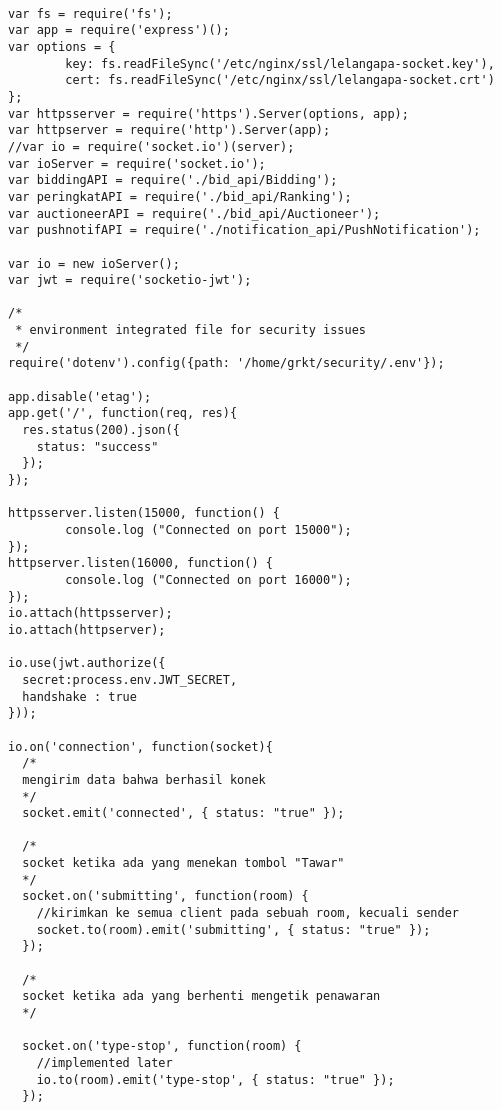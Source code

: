 \begin{lstlisting}[label=sc-socket-bid,style=htmlcssjs,caption=Kode Sumber Implementasi Node.js + Socket.io untuk Lelang]

var fs = require('fs');
var app = require('express')();
var options = {
        key: fs.readFileSync('/etc/nginx/ssl/lelangapa-socket.key'),
        cert: fs.readFileSync('/etc/nginx/ssl/lelangapa-socket.crt')
};
var httpsserver = require('https').Server(options, app);
var httpserver = require('http').Server(app);
//var io = require('socket.io')(server);
var ioServer = require('socket.io');
var biddingAPI = require('./bid_api/Bidding');
var peringkatAPI = require('./bid_api/Ranking');
var auctioneerAPI = require('./bid_api/Auctioneer');
var pushnotifAPI = require('./notification_api/PushNotification');

var io = new ioServer();
var jwt = require('socketio-jwt');

/*  
 * environment integrated file for security issues
 */
require('dotenv').config({path: '/home/grkt/security/.env'});

app.disable('etag');
app.get('/', function(req, res){
  res.status(200).json({
    status: "success"
  });
});

httpsserver.listen(15000, function() {
        console.log ("Connected on port 15000");
});
httpserver.listen(16000, function() {
        console.log ("Connected on port 16000");
});
io.attach(httpsserver);
io.attach(httpserver);

io.use(jwt.authorize({
  secret:process.env.JWT_SECRET,
  handshake : true
}));

io.on('connection', function(socket){
  /*
  mengirim data bahwa berhasil konek
  */
  socket.emit('connected', { status: "true" });

  /*
  socket ketika ada yang menekan tombol "Tawar"
  */
  socket.on('submitting', function(room) {
    //kirimkan ke semua client pada sebuah room, kecuali sender
    socket.to(room).emit('submitting', { status: "true" });
  });

  /*
  socket ketika ada yang berhenti mengetik penawaran
  */

  socket.on('type-stop', function(room) {
    //implemented later
    io.to(room).emit('type-stop', { status: "true" });
  });


\end{lstlisting}

